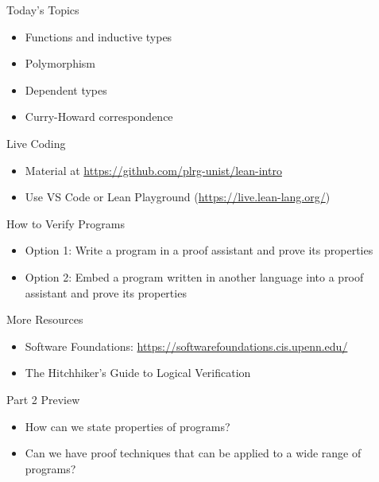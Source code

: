 \documentclass{beamer}
\begin{document}
\begin{frame}{Today's Topics}
  \begin{itemize}
    \item Functions and inductive types
    \item Polymorphism
    \item Dependent types
    \item Curry-Howard correspondence
  \end{itemize}
\end{frame}

\begin{frame}{Live Coding}
  \begin{itemize}
    \item Material at \url{https://github.com/plrg-unist/lean-intro}
    \item Use VS Code or Lean Playground (\url{https://live.lean-lang.org/})
  \end{itemize}
\end{frame}

\begin{frame}{How to Verify Programs}
  \begin{itemize}
    \item Option 1: Write a program in a proof assistant and prove its properties
    \item Option 2: Embed a program written in another language into a proof
      assistant and prove its properties
  \end{itemize}
\end{frame}

\begin{frame}{More Resources}
  \begin{itemize}
    \item Software Foundations: \url{https://softwarefoundations.cis.upenn.edu/}
    \item The Hitchhiker's Guide to Logical Verification
  \end{itemize}
\end{frame}

\begin{frame}{Part 2 Preview}
  \begin{itemize}
    \item How can we state properties of programs?
    \item Can we have proof techniques that can be applied to a wide range of programs?
  \end{itemize}
\end{frame}
\end{document}

